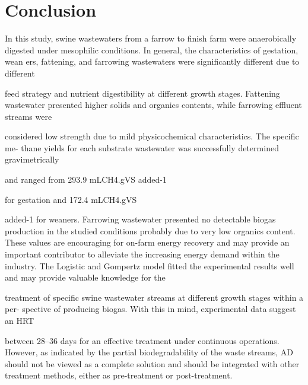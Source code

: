 \section{Conclusion}
In this study, swine wastewaters from a farrow to finish farm were anaerobically digested under mesophilic conditions. In general, the characteristics of gestation, wean
ers, fattening, and farrowing wastewaters were significantly different due to different

feed strategy and nutrient digestibility at different growth stages. Fattening wastewater
presented higher solids and organics contents, while farrowing effluent streams were

considered low strength due to mild physicochemical characteristics. The specific me-
thane yields for each substrate wastewater was successfully determined gravimetrically

and ranged from 293.9 mLCH4.gVS added-1

for gestation and 172.4 mLCH4.gVS

added-1
for weaners. Farrowing wastewater presented no detectable biogas production
in the studied conditions probably due to very low organics content. These values are
encouraging for on-farm energy recovery and may provide an important contributor to
alleviate the increasing energy demand within the industry. The Logistic and Gompertz
model fitted the experimental results well and may provide valuable knowledge for the

treatment of specific swine wastewater streams at different growth stages within a per-
spective of producing biogas. With this in mind, experimental data suggest an HRT

between 28–36 days for an effective treatment under continuous operations. However,
as indicated by the partial biodegradability of the waste streams, AD should not be
viewed as a complete solution and should be integrated with other treatment methods,
either as pre-treatment or post-treatment.